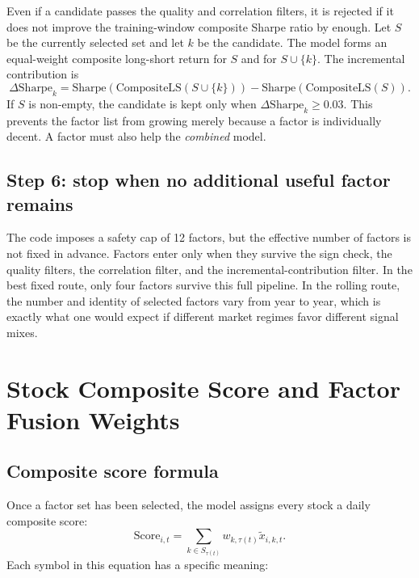 \documentclass[11pt]{article}
\begin{document}
Even if a candidate passes the quality and correlation filters, it is rejected if it does not improve the training-window composite Sharpe ratio by enough. Let \(S\) be the currently selected set and let \(k\) be the candidate. The model forms an equal-weight composite long-short return for \(S\) and for \(S \cup \{k\}\). The incremental contribution is
\[
\Delta \text{Sharpe}_k
=
\text{Sharpe}\!\left(\text{CompositeLS}(S \cup \{k\})\right)
-
\text{Sharpe}\!\left(\text{CompositeLS}(S)\right).
\]
If \(S\) is non-empty, the candidate is kept only when \(\Delta \text{Sharpe}_k \ge 0.03\). This prevents the factor list from growing merely because a factor is individually decent. A factor must also help the \emph{combined} model.

\subsection{Step 6: stop when no additional useful factor remains}

The code imposes a safety cap of 12 factors, but the effective number of factors is not fixed in advance. Factors enter only when they survive the sign check, the quality filters, the correlation filter, and the incremental-contribution filter. In the best fixed route, only four factors survive this full pipeline. In the rolling route, the number and identity of selected factors vary from year to year, which is exactly what one would expect if different market regimes favor different signal mixes.

\section{Stock Composite Score and Factor Fusion Weights}

\subsection{Composite score formula}

Once a factor set has been selected, the model assigns every stock a daily composite score:
\[
\text{Score}_{i,t}
=
\sum_{k \in S_{\tau(t)}} w_{k,\tau(t)} \tilde{x}_{i,k,t}.
\]
Each symbol in this equation has a specific meaning:
\end{document}
